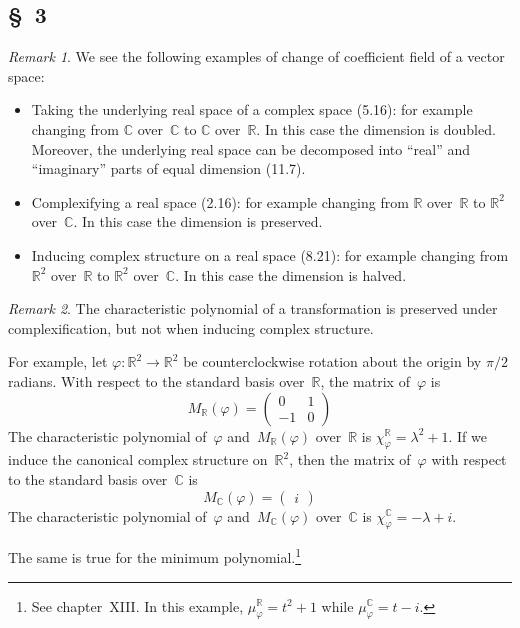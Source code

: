 \documentclass[letterpaper,12pt]{article}
\newcommand{\R}{\mathbb{R}}
\newcommand{\C}{\mathbb{C}}
\theoremstyle{definition}
\theoremstyle{remark}
\newtheorem*{rmk}{Remark}
\begin{document}
\subsection*{\S~3}
\begin{rmk}
We see the following examples of change of coefficient field of a vector space:
\begin{itemize}
\item Taking the underlying real space of a complex space (5.16): for example changing from \(\C\) over~\(\C\) to \(\C\) over~\(\R\). In this case the dimension is doubled. Moreover, the underlying real space can be decomposed into ``real'' and ``imaginary'' parts of equal dimension (11.7).
\item Complexifying a real space (2.16): for example changing from \(\R\) over~\(\R\) to \(\R^2\) over~\(\C\). In this case the dimension is preserved.
\item Inducing complex structure on a real space (8.21): for example changing from \(\R^2\) over~\(\R\) to \(\R^2\) over~\(\C\). In this case the dimension is halved.
\end{itemize}
\end{rmk}

\begin{rmk}
The characteristic polynomial of a transformation is preserved under complexification, but not when inducing complex structure.

For example, let \(\varphi:\R^2\to\R^2\) be counterclockwise rotation about the origin by \(\pi/2\) radians. With respect to the standard basis over~\(\R\), the matrix of~\(\varphi\) is
\[M_{\R}(\varphi)=\begin{pmatrix}
0&1\\
-1&0
\end{pmatrix}\]
The characteristic polynomial of~\(\varphi\) and~\(M_{\R}(\varphi)\) over~\(\R\) is \(\chi_{\varphi}^{\R}=\lambda^2+1\). If we induce the canonical complex structure on~\(\R^2\), then the matrix of~\(\varphi\) with respect to the standard basis over~\(\C\) is
\[M_{\C}(\varphi)=\begin{pmatrix}i\end{pmatrix}\]
The characteristic polynomial of~\(\varphi\) and~\(M_{\C}(\varphi)\) over~\(\C\) is \(\chi_{\varphi}^{\C}=-\lambda+i\).

The same is true for the minimum polynomial.\footnote{See chapter~XIII. In this example, \(\mu_{\varphi}^{\R}=t^2+1\) while \(\mu_{\varphi}^{\C}=t-i\).}
\end{rmk}
\end{document}
